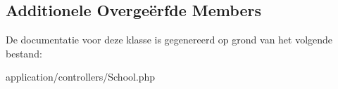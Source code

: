 \subsection*{Additionele Overge\"{e}rfde Members}


De documentatie voor deze klasse is gegenereerd op grond van het volgende bestand\+:\begin{DoxyCompactItemize}
\item 
application/controllers/School.\+php\end{DoxyCompactItemize}
